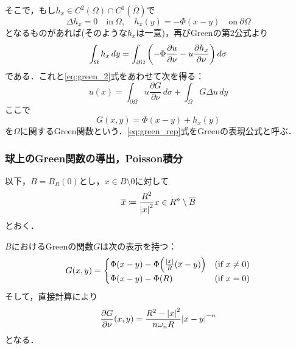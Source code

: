 \documentclass[a4paper]{ltjsarticle}
\newcommand{\Om}{\Omega}
\newcommand{\pOm}{\partial\Omega}
\newcommand{\Ombar}{\overline{\Omega}}
\newcommand{\inn}{\quad\text{in}\ }
\newcommand{\on}{\quad \text{on}\ }
\newcommand{\pvert}[1]{\frac{\partial #1}{\partial \nu}}
\newcommand{\1}{\mathbbm{1}}
\numberwithin{equation}{section}
\theoremstyle{definition}
\begin{document}
そこで，もし$h_x\in C^2(\Om)\cap C^1(\Ombar)$で
\begin{equation}
    \Delta h_x=0\inn \Om,\quad h_x(y)=-\Phi(x-y)\on \pOm 
\end{equation}
となるものがあれば(そのような$h_x$は一意)，再びGreenの第2公式より
\begin{equation}
    \int_{\Om}h_x\,dy=\int_{\pOm}\qty(-\Phi\pvert{u}-u\pvert{h_x})\,d\sigma 
\end{equation}
である．これと\eqref{eq:green_2}式をあわせて次を得る：
\begin{equation}
    u(x)=\int_{\pOm}u\pvert{G}\,d\sigma+\int_{\Om}G\Delta u\,dy \label{eq:green_rep}
\end{equation}
ここで
\begin{equation}
    G(x,y)=\Phi(x-y)+h_x(y) 
\end{equation}
を$\Om$に関するGreen関数という．\eqref{eq:green_rep}式をGreenの表現公式と呼ぶ．
\subsubsection{球上のGreen関数の導出，Poisson積分}
以下，$B=B_R(0)$とし，$x\in B\setminus\qty{0}$に対して 
\begin{equation}
    \overline{x}\coloneqq \frac{R^2}{\abs{x}^2}x \in R^n\setminus\overline{B} 
\end{equation}
とおく．

$B$におけるGreenの関数$G$は次の表示を持つ：
\begin{equation}
    G(x,y)=\begin{cases}
        \Phi(x-y)-\Phi\qty(\frac{\abs{x}}{R}(\overline{x}-y)) & (\text{if $x\neq0$})\\
        \Phi(x-y)-\Phi(R) & (\text{if $x=0$})
    \end{cases}
\end{equation}
そして，直接計算により
\begin{equation}
    \pvert{G}(x,y)=\frac{R^2-\abs{x}^2}{n\omega_nR}\abs{x-y}^{-n}
\end{equation}
となる．
\end{document}
